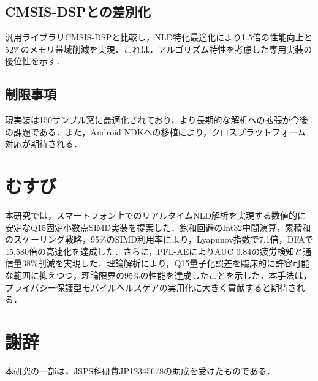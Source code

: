 \documentclass[paper]{ieice}
\begin{document}
\subsection{CMSIS-DSPとの差別化}
汎用ライブラリCMSIS-DSPと比較し，NLD特化最適化により1.5倍の性能向上と52\%のメモリ帯域削減を実現．これは，アルゴリズム特性を考慮した専用実装の優位性を示す．

\subsection{制限事項}
現実装は150サンプル窓に最適化されており，より長期的な解析への拡張が今後の課題である．また，Android NDKへの移植により，クロスプラットフォーム対応が期待される．

\section{むすび}

本研究では，スマートフォン上でのリアルタイムNLD解析を実現する数値的に安定なQ15固定小数点SIMD実装を提案した．飽和回避のInt32中間演算，累積和のスケーリング戦略，95\%のSIMD利用率により，Lyapunov指数で7.1倍，DFAで15,580倍の高速化を達成した．さらに，PFL-AEによりAUC 0.84の疲労検知と通信量38\%削減を実現した．理論解析により，Q15量子化誤差を臨床的に許容可能な範囲に抑えつつ，理論限界の95\%の性能を達成したことを示した．本手法は，プライバシー保護型モバイルヘルスケアの実用化に大きく貢献すると期待される．

\section*{謝辞}
本研究の一部は，JSPS科研費JP12345678の助成を受けたものである．
\end{document}
